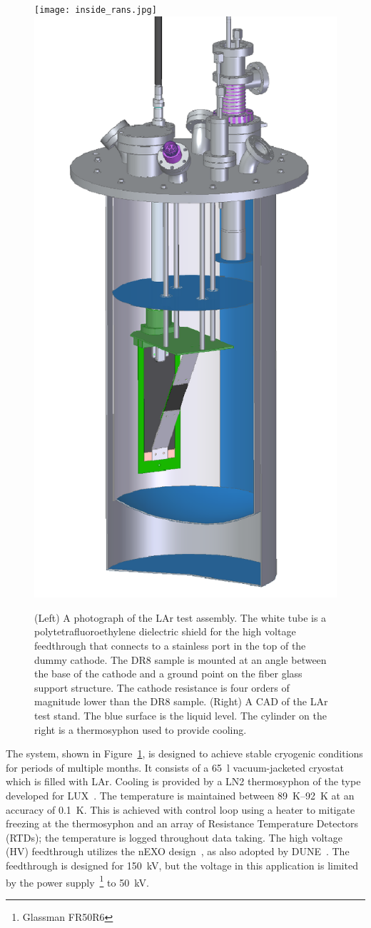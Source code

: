 \documentclass[a4paper,12pt]{article}
\newcommand{\DR}{DR8}
\begin{document}
\begin{figure}[ht]
	{\texttt{[image: inside\_rans.jpg]}}
	{\includegraphics[width=0.42\linewidth]{rans.png}}
	\caption{(Left) A photograph of the LAr test assembly.
		The white tube is a polytetrafluoroethylene dielectric shield for the high voltage feedthrough that connects to a stainless port in the top of the dummy cathode. 
		The {\DR} sample is mounted at an angle between the base of the cathode and a ground point on the fiber glass support structure. 
		The cathode resistance is four orders of magnitude lower than the {\DR} sample.
		(Right) A CAD of the LAr test stand. 
		The blue surface is the liquid level. 
		The cylinder on the right is a thermosyphon used to provide cooling.}
	\label{fig:full_sys}
\end{figure}

The system, shown in Figure~\ref{fig:full_sys}, is designed to achieve stable cryogenic conditions for periods of multiple months. 
It consists of a \SI{65}{\litre} vacuum-jacketed cryostat which is filled with LAr. 
Cooling is provided by a LN2 thermosyphon of the type developed for LUX~\cite{lux}.
The temperature is maintained between \SIrange{89}{92}{\kelvin} at an accuracy of \SI{0.1}{\kelvin}. 
This is achieved with control loop using a heater to mitigate freezing at the thermosyphon and an array of Resistance Temperature Detectors (RTDs); the temperature is logged throughout data taking.   
The high voltage (HV) feedthrough utilizes the nEXO design~\cite{nEXO_pcdr}, as also adopted by DUNE~\cite{DUNE:2021tad}. 
The feedthrough is designed for \SI{150}{\kilo\volt}, but the voltage in this application is limited by the power supply~\footnote{Glassman FR50R6} to \SI{50}{\kilo\volt}. 
\end{document}
